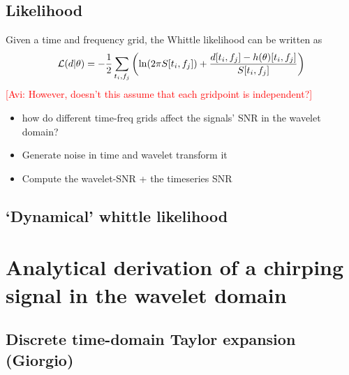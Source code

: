 \documentclass{article}
\newcommand{\avi}[1]{\textcolor{red}{[Avi: #1]}}
\begin{document}
\subsection{Likelihood}
Given a time and frequency grid, the Whittle likelihood can be written as 
\begin{equation}
    \mathcal{L}(d|\theta) = -\frac{1}{2}\sum_{t_i,f_j}\left( {\rm ln}(2\pi S[t_i,f_j]) + \frac{d[t_i,f_j] -h(\theta)[t_i,f_j]}{S[t_i,f_j]} \right)
\end{equation}
\avi{However, doesn't this assume that each gridpoint is independent?}


\begin{itemize}
    \item how do different time-freq grids affect the signals' SNR in the wavelet domain?
    \item Generate noise in time and wavelet transform it
    \item Compute the wavelet-SNR + the timeseries SNR
\end{itemize}




\subsection{`Dynamical' whittle likelihood}



\newpage

\section{Analytical derivation of a chirping signal in the wavelet domain}

\subsection{Discrete time-domain Taylor expansion (Giorgio)}
\end{document}
